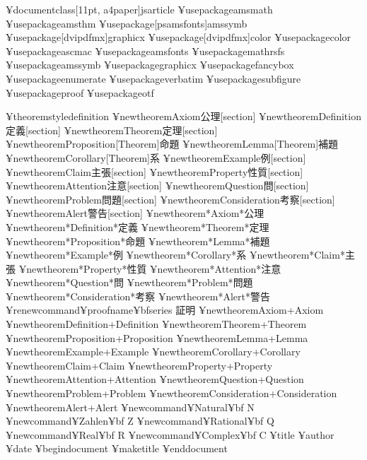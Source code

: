 ¥documentclass[11pt, a4paper]{jsarticle}
    ¥usepackage{amsmath}
    ¥usepackage{amsthm}
    ¥usepackage[psamsfonts]{amssymb}
    ¥usepackage[dvipdfmx]{graphicx}
    ¥usepackage[dvipdfmx]{color}
    ¥usepackage{color}
    ¥usepackage{ascmac}
    ¥usepackage{amsfonts}
    ¥usepackage{mathrsfs}
    ¥usepackage{amssymb}
    ¥usepackage{graphicx}
    ¥usepackage{fancybox}
    ¥usepackage{enumerate}
    ¥usepackage{verbatim}
    ¥usepackage{subfigure}
    ¥usepackage{proof}
    ¥usepackage{otf}    
 

    ¥theoremstyle{definition}
   ¥newtheorem{Axiom}{公理}[section]
    ¥newtheorem{Definition}{定義}[section]
    ¥newtheorem{Theorem}{定理}[section]
    ¥newtheorem{Proposition}[Theorem]{命題}
    ¥newtheorem{Lemma}[Theorem]{補題}
    ¥newtheorem{Corollary}[Theorem]{系}
    ¥newtheorem{Example}{例}[section]
    ¥newtheorem{Claim}{主張}[section]
    ¥newtheorem{Property}{性質}[section]
    ¥newtheorem{Attention}{注意}[section]
    ¥newtheorem{Question}{問}[section]
    ¥newtheorem{Problem}{問題}[section]
    ¥newtheorem{Consideration}{考察}[section]
    ¥newtheorem{Alert}{警告}[section]
    ¥newtheorem*{Axiom*}{公理}
    ¥newtheorem*{Definition*}{定義}
    ¥newtheorem*{Theorem*}{定理}
    ¥newtheorem*{Proposition*}{命題}
    ¥newtheorem*{Lemma*}{補題}
    ¥newtheorem*{Example*}{例}
    ¥newtheorem*{Corollary*}{系}
    ¥newtheorem*{Claim*}{主張}
    ¥newtheorem*{Property*}{性質}
    ¥newtheorem*{Attention*}{注意}
    ¥newtheorem*{Question*}{問}
    ¥newtheorem*{Problem*}{問題}
    ¥newtheorem*{Consideration*}{考察}
    ¥newtheorem*{Alert*}{警告}
    ¥renewcommand{¥proofname}{¥bfseries 証明}
    ¥newtheorem{Axiom+}{Axiom}
    ¥newtheorem{Definition+}{Definition}
    ¥newtheorem{Theorem+}{Theorem}
    ¥newtheorem{Proposition+}{Proposition}
    ¥newtheorem{Lemma+}{Lemma}
    ¥newtheorem{Example+}{Example}
    ¥newtheorem{Corollary+}{Corollary}
    ¥newtheorem{Claim+}{Claim}
    ¥newtheorem{Property+}{Property}
    ¥newtheorem{Attention+}{Attention}
    ¥newtheorem{Question+}{Question}
    ¥newtheorem{Problem+}{Problem}
    ¥newtheorem{Consideration+}{Consideration}
    ¥newtheorem{Alert+}{Alert}
    ¥newcommand{¥Natural}{{¥bf N}}%
    ¥newcommand{¥Zahlen}{{¥bf Z}}%
    ¥newcommand{¥Rational}{{¥bf Q}}%
    ¥newcommand{¥Real}{{¥bf R}}%
    ¥newcommand{¥Complex}{{¥bf C}}%
    ¥title{}
    ¥author{}
    ¥date{}
¥begin{document}
¥maketitle
¥end{document}
